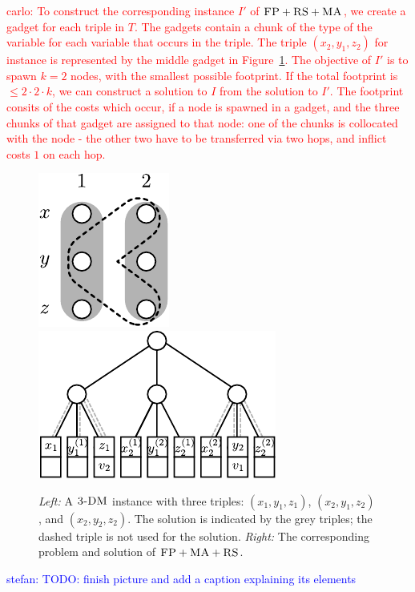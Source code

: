 \documentclass[9pt]{sigcomm-alternate}
\newcommand{\carlo}[1]{\textcolor{red}{carlo: #1}}
\newcommand{\stefan}[1]{\textcolor{blue}{stefan: #1}}
\newcommand{\FP}{\textsc{FP}}
\newcommand{\RS}{\textsc{RS}}
\newcommand{\MA}{\textsc{MA}}
\newcommand{\TDM}{\textsc{3-DM}}
\begin{document}
\carlo{To construct the corresponding instance $I'$ of $\FP+\RS+\MA$, we
create a gadget for each triple in $T$. The gadgets contain a chunk of the
type of the variable for each variable that occurs in the triple. The triple
$(x_2, y_1, z_2)$ for instance is represented by the middle gadget in
Figure~\ref{fig:fprsma}. The objective of $I'$ is to spawn $k=2$ nodes,
with the smallest possible footprint. If the total footprint is $\leq
2\cdot2\cdot k$, we can construct a solution to $I$ from the solution to $I'$.
The footprint consits of the costs which occur, if a node is spawned in a
gadget, and the three chunks of that gadget are assigned to that node: one of
the chunks is collocated with the node - the other two have to be transferred
via two hops, and inflict costs $1$ on each hop.}
\begin{figure}[t]
\includegraphics[width = 0.3\columnwidth]{figs/np_3dm_formular}
\hfill
\includegraphics[width = 0.6\columnwidth]{figs/np_3dm_construction}
\caption{\textit{Left:} A $\TDM$ instance with three triples:
$(x_1, y_1, z_1)$, $(x_2, y_1, z_2)$, and $(x_2, y_2, z_2)$. The solution is
indicated by the grey triples; the dashed triple is not used for the
solution. \textit{Right:} The corresponding problem and solution of $\FP + \MA
+ \RS$.}
\label{fig:fprsma}
\end{figure}
\stefan{TODO: finish picture and add a caption explaining its
elements}
\end{document}
